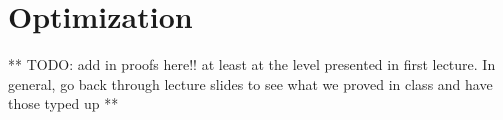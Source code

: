\documentclass{article}
\begin{document}
 

\newpage
\section{Optimization}
\label{sec:optimization}

** TODO: add in proofs here!! at least at the level presented in first
lecture. In general, go back through lecture slides to see what we
proved in class and have those typed up **


\end{document}

